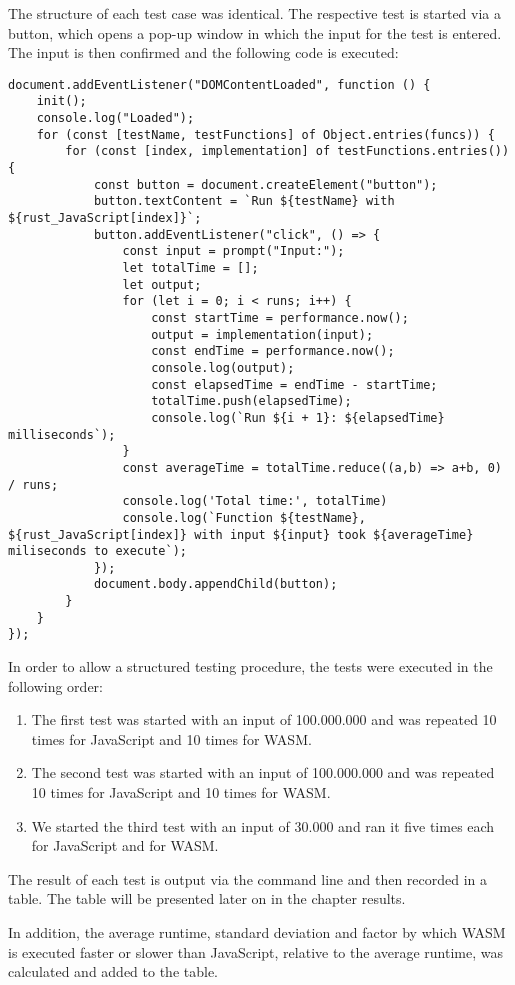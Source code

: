 The structure of each test case was identical. The respective test is started via a button, which opens a pop-up window in which the input for the test is entered. The input is then confirmed and the following code is executed:
\begin{verbatim}
document.addEventListener("DOMContentLoaded", function () {
    init();
    console.log("Loaded");
    for (const [testName, testFunctions] of Object.entries(funcs)) {
        for (const [index, implementation] of testFunctions.entries()) {
            const button = document.createElement("button");
            button.textContent = `Run ${testName} with ${rust_JavaScript[index]}`;
            button.addEventListener("click", () => {
                const input = prompt("Input:");
                let totalTime = [];
                let output;
                for (let i = 0; i < runs; i++) {
                    const startTime = performance.now();
                    output = implementation(input);
                    const endTime = performance.now();
                    console.log(output);
                    const elapsedTime = endTime - startTime;
                    totalTime.push(elapsedTime);
                    console.log(`Run ${i + 1}: ${elapsedTime} milliseconds`);
                }
                const averageTime = totalTime.reduce((a,b) => a+b, 0) / runs;
                console.log('Total time:', totalTime)
                console.log(`Function ${testName}, ${rust_JavaScript[index]} with input ${input} took ${averageTime} miliseconds to execute`);
            });
            document.body.appendChild(button);
        }
    }
});
\end{verbatim}

In order to allow a structured testing procedure, the tests were executed in the following order:
\begin{enumerate}
\item The first test was started with an input of 100.000.000 and was repeated 10 times for JavaScript and 10 times for WASM.
\item The second test was started with an input of 100.000.000 and was repeated 10 times for JavaScript and 10 times for WASM.
\item We started the third test with an input of 30.000 and ran it five times each for JavaScript and for WASM.
\end{enumerate}
The result of each test is output via the command line and then recorded in a table. The table will be presented later on in the chapter results.

In addition, the average runtime, standard deviation and factor by which WASM is executed faster or slower than JavaScript, relative to the average runtime, was calculated and added to the table.